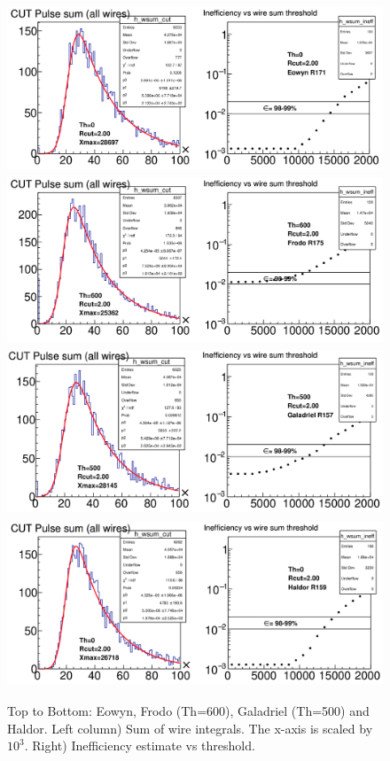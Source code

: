 \documentclass[12pt]{article}
\begin{document}
\begin{figure}[tbph]
\begin{center}
\includegraphics[height=5cm,clip=true]{Eowyn_R171_eff}
\includegraphics[height=5cm,clip=true]{Frodo_R175_Th600_eff}
\includegraphics[height=5cm,clip=true]{Galadriel_R157_Th500_eff}
\includegraphics[height=5cm,clip=true]{Haldor_R159_eff}
\caption{Top to Bottom: Eowyn, Frodo (Th=600), Galadriel (Th=500) and Haldor. Left column) Sum of wire integrals. The x-axis is scaled by $10^3$. Right) Inefficiency estimate vs threshold.
\label{fig:efficiencies_e-f}}
\end{center}
\end{figure} 
\end{document}
